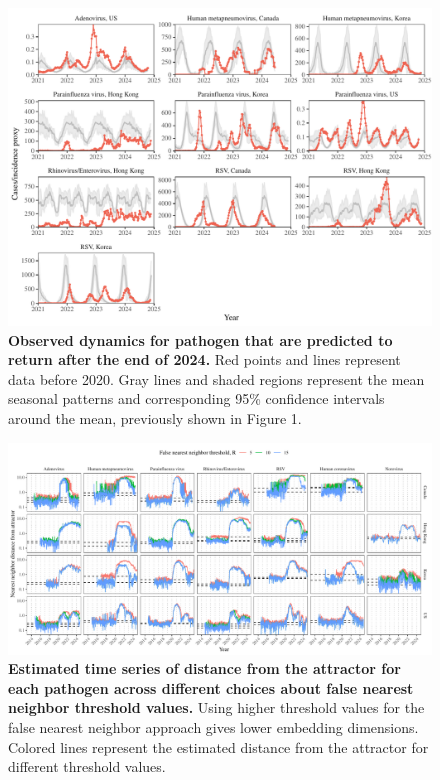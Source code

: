 \documentclass[12pt]{article}
\begin{document}
\pagebreak

\begin{figure}[!th]
\begin{center}
\includegraphics[width=\textwidth]{../figure4/figure4_noreturn.pdf}
\caption{
\textbf{Observed dynamics for pathogen that are predicted to return after the end of 2024.}
Red points and lines represent data before 2020.
Gray lines and shaded regions represent the mean seasonal patterns and corresponding 95\% confidence intervals around the mean, previously shown in Figure 1.
}
\end{center}
\end{figure}


\pagebreak

\begin{figure}[!th]
\begin{center}
\includegraphics[width=\textwidth]{../figure4_R/figure4_dist_R.pdf}
\caption{
\textbf{Estimated time series of distance from the attractor for each pathogen across different choices about false nearest neighbor threshold values.}
Using higher threshold values for the false nearest neighbor approach gives lower embedding dimensions.
Colored lines represent the estimated distance from the attractor for different threshold values.
}
\end{center}
\end{figure}
\end{document}
